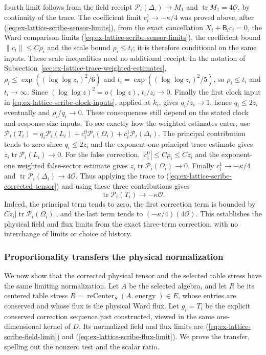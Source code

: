 fourth limit follows from the field receipt
$\mathcal P_i(\Delta_i)\to M_1$ and $\operatorname{tr}M_1=4\mathcal O$, by
continuity of the trace. The coefficient limit $c_i^1\to-\kappa/4$ was
proved above, after (\ref{eq:ex-lattice-scribe-sensor-limits}), from the
exact cancellation $X_i+\mathsf B_ic_i=0$, the Ward comparison limits
(\ref{eq:ex-lattice-scribe-sensor-limits}), the coefficient bound
$\|c_i\|\le C\rho_i$ and the scale bound $\rho_i\le t_i$; it is therefore
conditional on the same inputs. These scale inequalities need no additional receipt. In the notation
of Subsection~\ref{sec:ex-lattice-trace-weighted-estimates},
$\rho_i\le\exp((\log\log z_i)^2/6)$ and
$t_i=\exp((\log\log z_i)^2/5)$, so $\rho_i\le t_i$ and
$t_i\to\infty$. Since $(\log\log z)^2=o(\log z)$,
$t_i/z_i\to0$. Finally the first clock input in
\eqref{eq:ex-lattice-scribe-clock-inputs}, applied at $k_i$, gives
$q_i/z_i\to1$, hence $q_i\le2z_i$ eventually and
$\rho_i/q_i\to0$. These consequences still depend on the stated
clock and response-size inputs.
To see exactly how the weighted estimates enter, use
$\mathcal P_i(T_i)=q_i\mathcal P_i(L_i)
+c_i^0\mathcal P_i(\Omega_i)
+c_i^1\mathcal P_i(\Delta_i)$. The principal contribution tends
to zero since $q_i\le2z_i$ and the exponent-one principal trace estimate
gives $z_i\operatorname{tr}\mathcal P_i(L_i)\to0$. For the false
correction, $|c_i^0|\le C\rho_i\le Cz_i$ and the exponent-one
weighted false-sector estimate gives
$z_i\operatorname{tr}\mathcal P_i(\Omega_i)\to0$.
Finally $c_i^1\to-\kappa/4$ and
$\operatorname{tr}\mathcal P_i(\Delta_i)\to4\mathcal O$.
Thus applying the trace to (\ref{eq:ex-lattice-scribe-corrected-tensor})
and using these three contributions gives
\begin{equation}
 \operatorname{tr}\mathcal P_i(T_i)\longrightarrow-\kappa\mathcal O.
 \label{eq:ex-lattice-scribe-flux-limit}
\end{equation}
Indeed, the principal term tends to zero, the first correction term is
bounded by $C z_i|\operatorname{tr}\mathcal P_i(\Omega_i)|$, and the last
term tends to $(-\kappa/4)(4\mathcal O)$. This establishes the physical
field and flux limits from the exact three-term correction, with no
interchange of limits or choice of history.

\subsubsection{Proportionality transfers the physical normalization}

We now show that the corrected physical tensor and the selected table
stress have the same limiting normalization. Let $A$ be the selected
algebra, and let $R$ be its centered table stress
$R=\operatorname{reCenter}_S(A.\operatorname{energy})\in E$, whose entries
are conserved and whose flux is the physical Ward flux. Let $g_i=T_i$ be
the explicit conserved correction sequence just constructed, viewed in the
same one-dimensional kernel of $D$. Its normalized field
and flux limits are (\ref{eq:ex-lattice-scribe-field-limit}) and
(\ref{eq:ex-lattice-scribe-flux-limit}). We prove the transfer, spelling
out the nonzero test and the scalar ratio.


